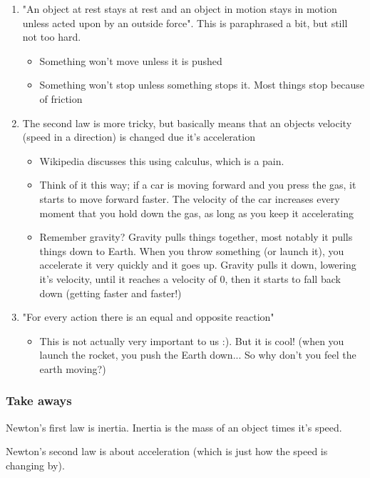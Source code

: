 \documentclass{article}
\begin{document}
\begin{enumerate}
	\item "An object at rest stays at rest and an object in motion stays in motion unless acted upon by an outside force". This is paraphrased a bit, but still not too hard.
	\begin{itemize}
		\item Something won't move unless it is pushed
		\item Something won't stop unless something stops it. Most things stop because of friction
	\end{itemize}
	\item The second law is more tricky, but basically means that an objects velocity (speed in a direction) is changed due it's acceleration
	\begin{itemize}
		\item Wikipedia discusses this using calculus, which is a pain.
		\item Think of it this way; if a car is moving forward and you press the gas, it starts to move forward faster. The velocity of the car increases every moment that you hold down the gas, as long as you keep it accelerating
		\item Remember gravity? Gravity pulls things together, most notably it pulls things down to Earth. When you throw something (or launch it), you accelerate it very quickly and it goes up. Gravity pulls it down, lowering it's velocity, until it reaches a velocity of 0, then it starts to fall back down (getting faster and faster!)
	\end{itemize}
	\item "For every action there is an equal and opposite reaction"
	\begin{itemize}
		\item This is not actually very important to us :). But it is cool! (when you launch the rocket, you push the Earth down... So why don't you feel the earth moving?)
	\end{itemize}
\end{enumerate}

\subsubsection{Take aways}

Newton's first law is inertia. Inertia is the mass of an object times it's speed.

Newton's second law is about acceleration (which is just how the speed is changing by).
\end{document}
